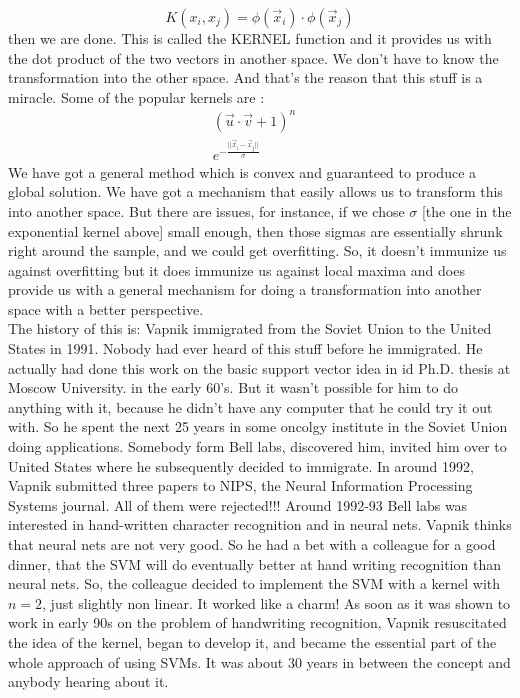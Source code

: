\documentclass[12pt,a4paper]{report}
\begin{document}
\begin{equation}
K(x_i , x_j) = \phi(\vec{x}_i) \cdot \phi(\vec{x}_j)
\end{equation}
then we are done. This is called the KERNEL function and it provides us with the dot product of the two vectors in another space. We don't have to know the transformation into the other space. And that's the reason that this stuff is a miracle. Some of the popular kernels are :
\begin{align}
(\vec{u} \cdot \vec{v} + 1 )^n & \\
e^{- \frac{||\vec{x}_i - \vec{x}_j||}{\sigma}}
\end{align}
We have got a general method which is convex and guaranteed to produce a global solution. We have got a mechanism that easily allows us to transform this into another space. But there are issues, for instance, if we chose $\sigma$ [the one in the exponential kernel above] small enough, then those sigmas are essentially shrunk right around the sample, and we could get overfitting. So, it doesn't immunize us against overfitting but it does immunize us against local maxima and does provide us with a general mechanism for doing a transformation into another space with a better perspective. \\
The history of this is: Vapnik immigrated from the Soviet Union to the United States in 1991. Nobody had ever heard of this stuff before he immigrated. He actually had done this work on the basic support vector idea in id Ph.D. thesis at Moscow University. in the early 60's. But it wasn't possible for him to do anything with it, because he didn't have any computer that he could try it out with. So he spent the next 25 years in some oncolgy institute in the Soviet Union doing applications. Somebody form Bell labs, discovered him, invited him over to United States where he subsequently decided to immigrate. In around 1992, Vapnik submitted three papers to NIPS, the Neural Information Processing Systems journal. All of them were rejected!!! Around 1992-93 Bell labs was interested in hand-written character recognition and in neural nets. Vapnik thinks that neural nets are not very good. So he had a bet with a colleague for a good dinner, that the SVM will do eventually better at hand writing recognition than neural nets. So, the colleague decided to implement the SVM with a kernel with $n=2$, just slightly non linear. It worked like a charm! As soon as it was shown to work in early 90s on the problem of handwriting recognition, Vapnik resuscitated the idea of the kernel, began to develop it, and became the essential part of the whole approach of using SVMs. It was about 30 years in between the concept and anybody hearing about it.  
\end{document}
